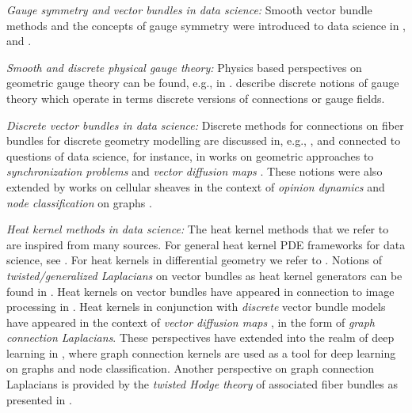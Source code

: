 \documentclass[10pt,reqno]{amsart}
\numberwithin{equation}{section}
\theoremstyle{bfnote}
\theoremstyle{bfdef}
\begin{document}
	\textit{Gauge symmetry and vector bundles in data science:}
	Smooth vector bundle methods and the concepts of gauge symmetry were introduced to data science in \cite{batardHeatEquationsVector2011,batardClassGeneralizedLaplacians2014,batardHighOrderDIPVBTVImage2025}, and \cite{weilerCoordinateIndependentConvolutional2021,gerkenGeometricDeepLearning2021}.


	\textit{Smooth and discrete physical gauge theory:}
	Physics based perspectives on geometric gauge theory can be found, e.g., in \cite{peskinIntroductionQuantumField1995a,hamiltonMathematicalGaugeTheory2017,tong2018gauge,wipfSymmetrienPhysikGruppen2023}. \cite{baezSpinNetworkStates1996,Gattringer:2010zz,rotheLatticeGaugeTheories2012,jiangGaugeTheoryGraphs2023} describe discrete notions of gauge theory which operate in terms discrete versions of connections or gauge fields.

	\textit{Discrete vector bundles in data science:}
	Discrete methods for connections on fiber bundles for discrete geometry modelling are discussed in, e.g., \cite{leokDiscreteTheoryConnections2005}, and connected to questions of data science, for instance, in works on geometric approaches to \textit{synchronization problems} \cite{Abbe:2018ab,gaoGeometrySynchronizationProblems2019,Carletti:2023aa} and \textit{vector diffusion maps} \cite{Singer:2012aa,gaoDiffusionGeometryFibre2021}.
	These notions were also extended by works on cellular sheaves in the context of \textit{opinion dynamics} \cite{hansenOpinionDynamicsDiscourse2021} and \textit{node classification} on graphs \cite{bodnarNeuralSheafDiffusion2023,bambergerBundleNeuralNetworks2024}.

	\textit{Heat kernel methods in data science: }
	The heat kernel methods that we refer to are inspired from many sources. For general heat kernel PDE frameworks for data science, see \cite{Alvarez:1993aa,Lindeberg:1994aa,Weickert:1998aa,Lindeberg:2022aa}. For heat kernels in differential geometry we refer to \cite{chavelEigenvaluesRiemannianGeometry1984,Davies:1989aa,Berline:1996aa,Grigoryan:2009aa,Avramidi:2015aa}.
	Notions of \textit{twisted/generalized Laplacians} on vector bundles as heat kernel generators can be found in \cite{Berline:1996aa,hamiltonMathematicalGaugeTheory2017}.
	Heat kernels on vector bundles have appeared in connection to image processing in \cite{batardHeatEquationsVector2011,batardClassGeneralizedLaplacians2014,batardHighOrderDIPVBTVImage2025}.
	Heat kernels in conjunction with \textit{discrete} vector bundle models have appeared in the context of \textit{vector diffusion maps} \cite{Singer:2012aa}, in the form of \textit{graph connection Laplacians}.
	These perspectives have extended into the realm of deep learning in \cite{bodnarNeuralSheafDiffusion2023,bambergerBundleNeuralNetworks2024}, where graph connection kernels are used as a tool for deep learning on graphs and node classification.
	Another perspective on graph connection Laplacians is provided by the \textit{twisted Hodge theory} of associated fiber bundles as presented in \cite{gaoGeometrySynchronizationProblems2019,gaoDiffusionGeometryFibre2021}.
\end{document}
